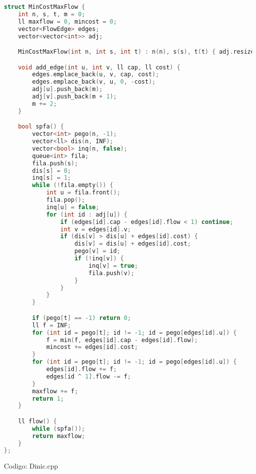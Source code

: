 \documentclass[10pt, a4paper, oneside]{book}
\begin{document}
\begin{lstlisting}[language=C++]
struct MinCostMaxFlow {
    int n, s, t, m = 0;
    ll maxflow = 0, mincost = 0;
    vector<FlowEdge> edges;
    vector<vector<int>> adj;

    MinCostMaxFlow(int n, int s, int t) : n(n), s(s), t(t) { adj.resize(n); }

    void add_edge(int u, int v, ll cap, ll cost) {
        edges.emplace_back(u, v, cap, cost);
        edges.emplace_back(v, u, 0, -cost);
        adj[u].push_back(m);
        adj[v].push_back(m + 1);
        m += 2;
    }

    bool spfa() {
        vector<int> pego(n, -1);
        vector<ll> dis(n, INF);
        vector<bool> inq(n, false);
        queue<int> fila;
        fila.push(s);
        dis[s] = 0;
        inq[s] = 1;
        while (!fila.empty()) {
            int u = fila.front();
            fila.pop();
            inq[u] = false;
            for (int id : adj[u]) {
                if (edges[id].cap - edges[id].flow < 1) continue;
                int v = edges[id].v;
                if (dis[v] > dis[u] + edges[id].cost) {
                    dis[v] = dis[u] + edges[id].cost;
                    pego[v] = id;
                    if (!inq[v]) {
                        inq[v] = true;
                        fila.push(v);
                    }
                }
            }
        }

        if (pego[t] == -1) return 0;
        ll f = INF;
        for (int id = pego[t]; id != -1; id = pego[edges[id].u]) {
            f = min(f, edges[id].cap - edges[id].flow);
            mincost += edges[id].cost;
        }
        for (int id = pego[t]; id != -1; id = pego[edges[id].u]) {
            edges[id].flow += f;
            edges[id ^ 1].flow -= f;
        }
        maxflow += f;
        return 1;
    }

    ll flow() {
        while (spfa());
        return maxflow;
    }
};
\end{lstlisting}
\hfill

Codigo: Dinic.cpp
\end{document}
